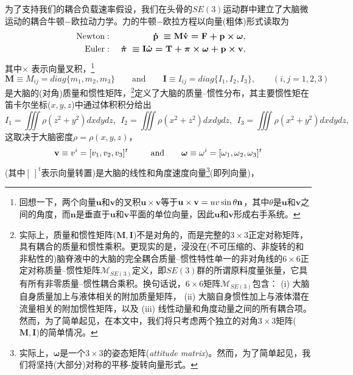 \documentclass[11pt,fontset=founder]{ctexart}
\begin{document}
为了支持我们的耦合负载速率假设，我们在头骨的$SE(3)$运动群中建立了大脑微运动的耦合牛顿−欧拉动力学。力的牛顿−欧拉方程以向量(粗体)形式读取为
\begin{eqnarray}
\text{Newton} &:&~\boldsymbol{\dot{\mathbf p}}~\boldsymbol{\equiv \mathbf M\dot{\mathbf v}=\mathbf{F+p}\times \omega }%
,  \label{vecForm} \\
\text{Euler} &:&~\boldsymbol{\dot{\pi}}~\boldsymbol{\equiv \mathbf I\dot{\omega}=\mathbf T+\pi
\times \omega +\mathbf p\times \mathbf v},  \notag
\end{eqnarray}
其中$\times $ 表示向量叉积，\footnote{回想一下，两个向量$\mathbf{u} $和$\mathbf{v}$的叉积$\mathbf{u\times v}$等于$\mathbf{u\times v}=uv\func{sin}\theta \mathbf{n}$，其中$\theta $是$\mathbf{u} $和$\mathbf{v}$之间的角度，而$ \mathbf{n}$是垂直于$\mathbf{u} $和$\mathbf{v}$平面的单位向量，因此$\mathbf{u} $和$\mathbf{v}$形成右手系统。}
\begin{equation*}
\mathbf{M}\equiv M_{ij}=diag\{m_{1},m_{2},m_{3}\}\qquad \text{and}\qquad
\mathbf{I}\equiv I_{ij}=diag\{I_{1},I_{2},I_{3}\},\qquad(i,j=1,2,3)
\end{equation*}
是大脑的(对角)质量和惯性矩阵，\footnote{实际上，质量和惯性矩阵($\mathbf{M,I}$)不是对角的，而是完整的$3\times 3$正定对称矩阵，具有耦合的质量和惯性乘积。更现实的是，浸没在(不可压缩的、非旋转的和非粘性的)脑脊液中的大脑的完全耦合质量–惯性特性单一的非对角线的$6\times 6$正定对称质量–惯性矩阵$ \mathcal{M}_{SE(3)}$定义，即$SE(3)$群的所谓原料度量张量，它具有所有非零质量–惯性耦合乘积。换句话说，$6\times 6$矩阵$\mathcal{M}_{SE(3)}$包含： (i) 大脑自身质量加上与液体相关的附加质量矩阵， (ii) 大脑自身惯性加上与液体潜在流量相关的附加惯性矩阵，以及 (iii) 线性动量和角度动量之间的所有耦合项。然而，为了简单起见，在本文中，我们将只考虑两个独立的对角$3\times 3$矩阵($\mathbf{M,I}$)的简单情况。}定义了大脑的质量–惯性分布，其主要惯性矩在笛卡尔坐标($x,y,z$)中通过体积积分给出
\begin{equation*}
I_{1}=\iiint \rho (z^{2}+y^{2})dxdydz,~~I_{2}=\iiint \rho
(x^{2}+z^{2})dxdydz,~~I_{3}=\iiint \rho (x^{2}+y^{2})dxdydz,
\end{equation*}
这取决于大脑密度$\rho =\rho (x,y,z)$，
\begin{equation*}
\mathbf{v}\equiv v^{i}=[v_{1},v_{2},v_{3}]^{t}\qquad \text{and\qquad }%
\mathbf{\omega }\equiv {\omega }^{i}=[\omega _{1},\omega _{2},\omega
_{3}]^{t}
\end{equation*}
(其中$[~]^{t}$表示向量转置)是大脑的线性和角度速度向量\footnote{实际上，$\mathbf{\omega }$是一个$3\times 3$的姿态矩阵(\emph{attitude matrix})。然而，为了简单起见，我们将坚持(大部分)对称的平移-旋转向量形式。}(即列向量)，
\end{document}
